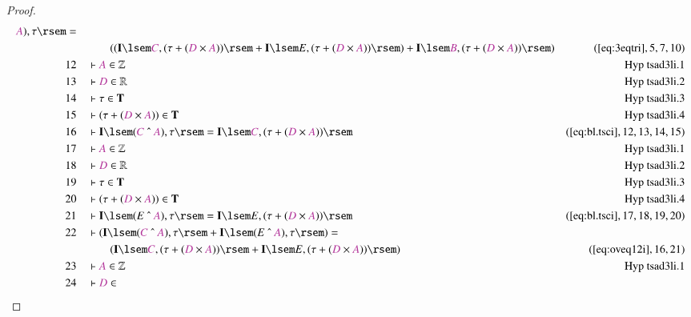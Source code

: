\begin{proof}
\begin{align}
      \mc{A} ) , \tau \rsem =  \notag \\ & & & \qquad
     ( ( \mathbf{I} \lsem \mc{C} ,
      ( \tau + ( \mc{D} \times \mc{A} ) ) \rsem + \mathbf{I}
      \lsem E , ( \tau + ( \mc{D} \times \mc{A} ) ) \rsem )
      + \mathbf{I} \lsem \mc{B} , ( \tau + ( \mc{D} \times
      \mc{A} ) ) \rsem
      )&(\mbox{\ref{eq:3eqtri}},5,7,10)\notag
  \\ 12 &&  & \vdash \mc{A} \in
      \mathbb{Z}&\text{Hyp~tsad3li.1}\notag%
  \\ 13 &&  & \vdash \mc{D} \in
      \mathbb{R}&\text{Hyp~tsad3li.2}\notag%
  \\ 14 &&  & \vdash \tau \in
      \mathbf{T}&\text{Hyp~tsad3li.3}\notag%
  \\ 15 &&  & \vdash ( \tau + ( \mc{D} \times \mc{A} ) ) \in
      \mathbf{T}&\text{Hyp~tsad3li.4}\notag%
  \\ 16 &&  & \vdash \mathbf{I} \lsem ( \mc{C} ~\string^~ \mc{A} ) , \tau \rsem
      = \mathbf{I} \lsem \mc{C} , ( \tau + ( \mc{D} \times
      \mc{A} ) )
      \rsem&(\mbox{\ref{eq:bl.tsci}},12,13,14,15)\notag
  \\ 17 &&  & \vdash \mc{A} \in
      \mathbb{Z}&\text{Hyp~tsad3li.1}\notag%
  \\ 18 &&  & \vdash \mc{D} \in
      \mathbb{R}&\text{Hyp~tsad3li.2}\notag%
  \\ 19 &&  & \vdash \tau \in
      \mathbf{T}&\text{Hyp~tsad3li.3}\notag%
  \\ 20 &&  & \vdash ( \tau + ( \mc{D} \times \mc{A} ) ) \in
      \mathbf{T}&\text{Hyp~tsad3li.4}\notag%
  \\ 21 &&  & \vdash \mathbf{I} \lsem ( E ~\string^~ \mc{A} ) , \tau \rsem =
      \mathbf{I} \lsem E , ( \tau + ( \mc{D} \times \mc{A} )
      ) \rsem&(\mbox{\ref{eq:bl.tsci}},17,18,19,20)\notag
  \\ 22 &&  & \vdash ( \mathbf{I} \lsem ( \mc{C} ~\string^~ \mc{A} ) , \tau
      \rsem + \mathbf{I} \lsem ( E ~\string^~ \mc{A} ) ,
      \tau \rsem ) =  \notag \\ & & & \qquad
     ( \mathbf{I} \lsem \mc{C} , ( \tau + (
      \mc{D} \times \mc{A} ) ) \rsem + \mathbf{I} \lsem E ,
      ( \tau + ( \mc{D} \times \mc{A} ) ) \rsem
      )&(\mbox{\ref{eq:oveq12i}},16,21)\notag
  \\ 23 &&  & \vdash \mc{A} \in
      \mathbb{Z}&\text{Hyp~tsad3li.1}\notag%
  \\ 24 &&  & \vdash \mc{D} \in

\end{align}
\end{proof}
